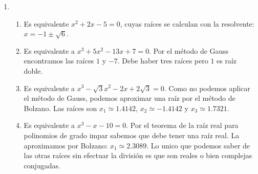 \documentclass[a4paper]{article}
\newcommand{\exercise}{\item}
\begin{document}
\begin{enumerate}
\begin{enumerate} [label=(\alph*)]
		\item Sacando facotr común obtenemos $x^5~(x^2+18x+81)$, y por la fórmula resolvente cuadrática obtenemos la raiz dolbe $-9$. La factorización queda $x^5~(x+9)^2$. \href{https://youtu.be/Z1KatpJM2eU}{Resolución}
		\item Sustituimos $y=x^2$ yel polinomio queda como $y^2+2y-2$, al que le calculamos las raices con la resolvente. Obtenemos la raíz doble $y=1$, de la que obtenemos las raíces $x=\pm1$. Por lo tanto el polinomio factorizado es: $(x-1)^2(x+1)^2$. 
		\item Sacamos factor común y obtenemos el polinomio $x^2(x^4-x^2-20)$. Para buscar las raíces restantes realizamos la sustitución $t^2$ y el polinomio resultante es $t(t^2-t-20)$. Con la resolvente obtenemos los valores de $t=5$, del que obtenemos $x=\pm \sqrt{5}$, y $t=-4$, del que obtenemos $x=\pm2i$. Finalmenta la factorización compleja queda como: $x^2(x-\sqrt{5})(x+\sqrt{5})(x-2i)(x+2i)$. Y la factorización real queda como $x^2(x-\sqrt{5})(x+\sqrt{5})(x^+4)$.
		\item Sacamos factor común $x(x^6-1)$ y buscamos las otras raíces resolviendo la ecuación $x^6=1$ por fórmula de De Moivre. La factorización queda $x (x-1) (x+1) (x-e^{\frac{\pi}{3}i}) (x-e^{\frac{2\pi}{3}i}) (x-e^{\frac{4\pi}{3}i}) (x-e^{\frac{5\pi}{3}i})$. \href{https://youtu.be/EQIEmdkGOZE}{Resolución}
		\item Sustituímos $u=x^3$ y obtenemos $u^2+3u-4$. Por la resolvente obtenemos las raíces $u=1$ y $u=-4$. Resolvemos $x^3=1$ y $x^3=-4$ con la fórmula de De Moivre para encontrar las raíces. La factorización queda $(x-1)(x-e^{\frac{2\pi}{3}i})(x-e^{\frac{4\pi}{3}i})(x-\sqrt[3]{4})(x-\sqrt[3]{4}e^{\frac{\pi}{3}i})(x-\sqrt[3]{4}e^{\frac{5\pi}{3}i})$. \href{https://youtu.be/BCo0pxE288w}{Resolución}
\end{enumerate}\exercise\begin{enumerate} [label=(\alph*)]		\item Es equivalente $x^2+2x-5=0$, cuyas raíces se calculan con la resolvente: $x=-1\pm\sqrt{6}$.
		\item Es equivalente a $x^3+5x^2-13x +7 =0$. Por el método de Gauss encontramos las raíces $1$ y $-7$. Debe haber tres raíces pero $1$ es raíz doble.
		\item Es equivalente a $x^3 -\sqrt{3}x^2 - 2x + 2\sqrt{3} = 0$. Como no podemos aplicar el método de Gauss, podemos aproximar una raíz por el método de Bolzano. Las raíces son $x_1 \simeq 1.4142$, $x_2 \simeq -1.4142$ y $x_3 \simeq 1.7321$.
		\item Es equivalente a $x^3-x-10=0$. Por el teorema de la raíz real para polinomios de grado impar sabemos que debe tener una raíz real. La aproximamos por Bolzano: $x_1 \simeq 2.3089$. Lo unico que podemos saber de las otras raíces sin efectuar la división es que son reales o bien complejas conjugadas.

\end{enumerate}
\end{enumerate}
\end{document}
